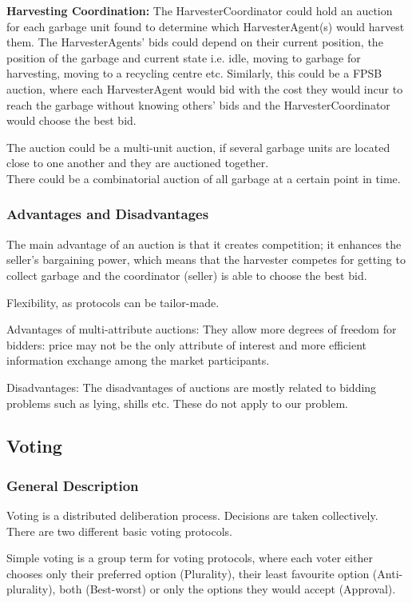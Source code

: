 \textbf{Harvesting Coordination:} The HarvesterCoordinator could hold an auction for each garbage unit found to determine which HarvesterAgent(s) would harvest them. The HarvesterAgents' bids could depend on their current position, the position of the garbage and current state i.e. idle, moving to garbage for harvesting, moving to a recycling centre etc. Similarly, this could be a FPSB auction, where each HarvesterAgent would bid with the cost they would incur to reach the garbage without knowing others' bids and the HarvesterCoordinator would choose the best bid. 

The auction could be a multi-unit auction, if several garbage units are located close to one another and they are auctioned together.
\\There could be a combinatorial auction of all garbage at a certain point in time.


\subsubsection{Advantages and Disadvantages}

The main advantage of an auction is that it creates competition; it enhances the seller's bargaining power, which means that the harvester competes for getting to collect garbage and the coordinator (seller) is able to choose the best bid.

Flexibility, as protocols can be tailor-made.

Advantages of multi-attribute auctions: They allow more degrees of freedom for bidders: price may not be the only attribute of interest and more efficient information exchange among the market participants.

Disadvantages:
The disadvantages of auctions are mostly related to bidding problems such as lying, shills etc. These do not apply to our problem. 


\subsection{Voting}

\subsubsection{General Description}

Voting is a distributed deliberation process. Decisions are taken collectively. There are two different basic voting protocols. 

Simple voting is a group term for voting protocols, where each voter either chooses only their preferred option (Plurality), their least favourite option (Anti-plurality), both (Best-worst) or only the options they would accept (Approval).

